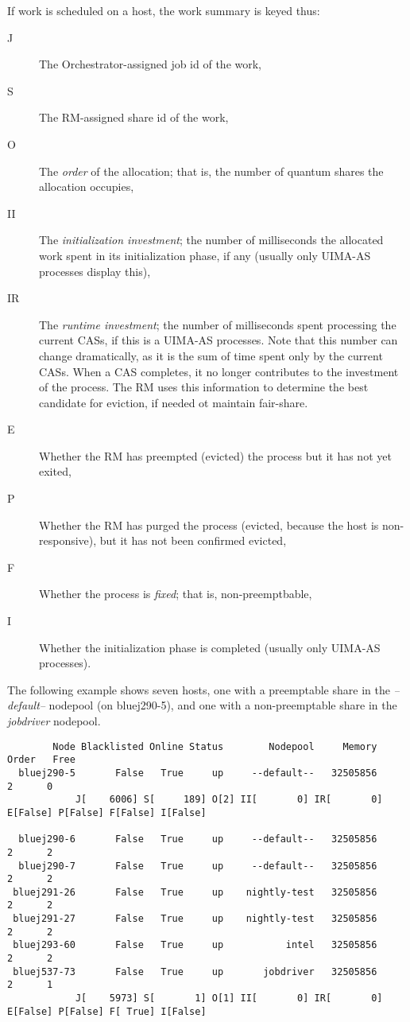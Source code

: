     If work is scheduled on a host, the work summary is keyed thus:
    \begin{description}
      \item[J] The Orchestrator-assigned job id of the work,
      \item[S] The RM-assigned share id of the work,
      \item[O] The {\em order} of the allocation; that is, the number of quantum shares the allocation occupies,
      \item[II] The {\em initialization investment}; the number of milliseconds the allocated work spent in its
        initialization phase, if any (usually only UIMA-AS processes display this),
      \item[IR] The {\em runtime investment}; the number of milliseconds spent processing the current CASs, if this
        is a UIMA-AS processes.  Note that this number can change dramatically, as it is the sum of time spent only
        by the current CASs.  When a CAS completes, it no longer contributes to the investment of the process.  The RM
        uses this information to determine the best candidate for eviction, if needed ot maintain fair-share.
      \item[E] Whether the RM has preempted (evicted) the process but it has not yet exited,
      \item[P] Whether the RM has purged the process (evicted, because the host is non-responsive), but it has not
        been confirmed evicted,
      \item[F] Whether the process is {\em fixed}; that is, non-preemptbable,
      \item[I] Whether the initialization phase is completed (usually only UIMA-AS processes).
    \end{description}

    The following example shows seven hosts, one with a preemptable share in the {\em --default--}
    nodepool (on bluej290-5), and one with a non-preemptable share in the {\em jobdriver} nodepool.
\begin{verbatim}
        Node Blacklisted Online Status        Nodepool     Memory Order   Free
  bluej290-5       False   True     up     --default--   32505856     2      0
            J[    6006] S[     189] O[2] II[       0] IR[       0] E[False] P[False] F[False] I[False]

  bluej290-6       False   True     up     --default--   32505856     2      2
  bluej290-7       False   True     up     --default--   32505856     2      2
 bluej291-26       False   True     up    nightly-test   32505856     2      2
 bluej291-27       False   True     up    nightly-test   32505856     2      2
 bluej293-60       False   True     up           intel   32505856     2      2
 bluej537-73       False   True     up       jobdriver   32505856     2      1
            J[    5973] S[       1] O[1] II[       0] IR[       0] E[False] P[False] F[ True] I[False]


\end{verbatim}


